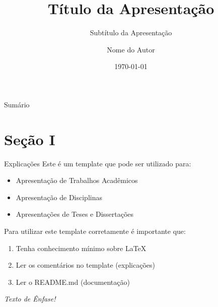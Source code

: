 \documentclass{libs/ufc_format}
\title[short title]{\huge\textbf{Título da Apresentação}}
\subtitle{Subtítulo da Apresentação}
\author{Nome do Autor}
\institute[UFC]{
    \normalsize{\email{usuario@dominio}}
    \newline
    \department{Nome do Departamento}
    \newline
    \ufc
}
\date{\today}
\begin{document}


\begin{frame}{}
    \maketitle
\end{frame}

\begin{frame}{Sumário}
    \begin{multicols}{2}
        \tableofcontents
    \end{multicols}
\end{frame}

\section{Seção I}
\begin{frame}{Explicações}
    Este é um template que pode ser utilizado para:
    \begin{itemize}
        \item Apresentação de Trabalhos Acadêmicos
        \item Apresentação de Disciplinas
        \item Apresentações de Teses e Dissertações
    \end{itemize}

    \vspace{0.4cm} %
    
    Para utilizar este template corretamente é importante que:
    \begin{enumerate}
        \item Tenha conhecimento mínimo sobre LaTeX
        \item Ler os comentários no template (explicações)
        \item Ler o README.md (documentação)
    \end{enumerate}

    \vspace{0.2cm}

     \emph{Texto de Ênfase!}
\end{frame}
\end{document}
